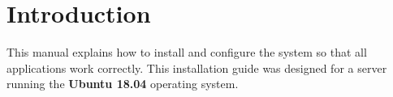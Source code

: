 \section{Introduction}

This manual explains how to install and configure the system so that all applications work correctly. This installation guide was designed for a server running the \textbf{Ubuntu 18.04} operating system.